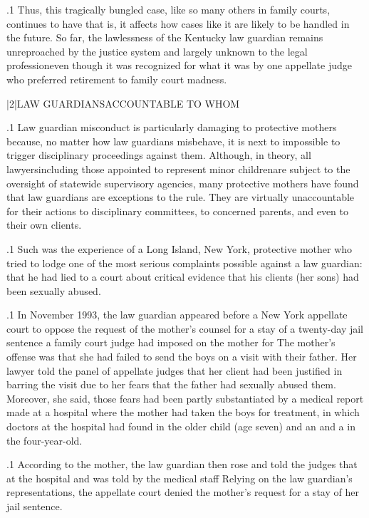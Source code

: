 \documentclass[11pt, twoside]{article}
\begin{document}
{{}%

\p.1{%
Thus, this tragically bungled case, like so many others in family
courts, continues to have \mdash{}that is, it affects how
cases like it are likely to be handled in the future. So far, the lawlessness of the Kentucky law guardian remains unreproached by the justice
system and largely unknown to the legal profession\mdash{}even though it
was recognized for what it was by one appellate judge who preferred
retirement to family court madness.
}%


\s|2|{LAW GUARDIANS\mdash{}ACCOUNTABLE TO WHOM\qm{}}

\p.1{%
\noindent{}Law guardian misconduct is particularly damaging to protective mothers because, no matter how law guardians misbehave, it is next to
impossible to trigger disciplinary proceedings against them. Although,
in theory, all lawyers\mdash{}including those appointed to represent minor
children\mdash{}are subject to the oversight of statewide supervisory agencies,
many protective mothers have found that law guardians are exceptions to the rule. They are virtually unaccountable for their actions to
disciplinary committees, to concerned parents, and even to their own
clients.
}%

\p.1{%
Such was the experience of a Long Island, New York, protective
mother who tried to lodge one of the most serious complaints possible
against a law guardian: that he had lied to a court about critical evidence
that his clients (her sons) had been sexually abused.
}%

\p.1{%
In November 1993, the law guardian appeared before a New York appellate court to oppose the request of the mother’s counsel for a stay
of a twenty-day jail sentence a family court judge had imposed on the
mother for  The mother’s offense was that she had
failed to send the boys on a visit with their father. Her lawyer told the
panel of appellate judges that her client had been justified in barring the
visit due to her fears that the father had sexually abused them. Moreover,
she said, those fears had been partly substantiated by a medical report
made at a hospital where the mother had taken the boys for treatment, in
which doctors at the hospital had found  in the
older child (age seven) and an  and a  in the four-year-old.
}%

\p.1{%
According to the mother, the law guardian then rose and told the
judges that  at the hospital and was told by the medical staff  Relying on the law guardian’s representations, the
appellate court denied the mother’s request for a stay of her jail
sentence.
}%

}
\end{document}
